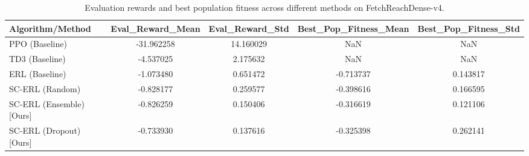\begin{table}
\caption{Evaluation rewards and best population fitness across different methods on FetchReachDense-v4.}
\label{tab:summary_FetchReachDense-v4}
\begin{tabular}{lcccc}
\toprule
Algorithm/Method & Eval_Reward_Mean & Eval_Reward_Std & Best_Pop_Fitness_Mean & Best_Pop_Fitness_Std \\
\midrule
PPO (Baseline) & -31.962258 & 14.160029 & NaN & NaN \\
TD3 (Baseline) & -4.537025 & 2.175632 & NaN & NaN \\
ERL (Baseline) & -1.073480 & 0.651472 & -0.713737 & 0.143817 \\
SC-ERL (Random) & -0.828177 & 0.259577 & -0.398616 & 0.166595 \\
SC-ERL (Ensemble) [Ours] & -0.826259 & 0.150406 & -0.316619 & 0.121106 \\
SC-ERL (Dropout) [Ours] & -0.733930 & 0.137616 & -0.325398 & 0.262141 \\
\bottomrule
\end{tabular}
\end{table}
